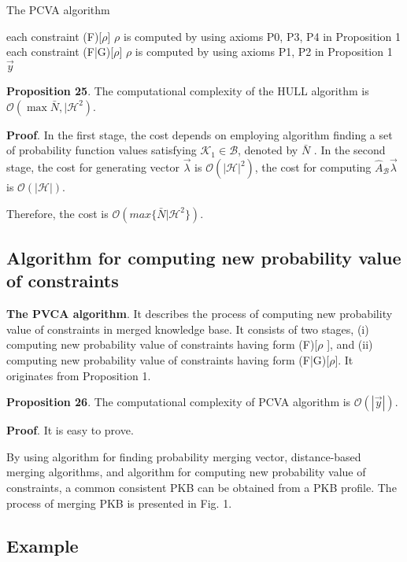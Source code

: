 \documentclass[]{iosart2c}
\begin{document}
\begin{algorithm}
\caption{The PCVA algorithm}
\begin{algorithmic}[1]
\For each constraint (F)[$\rho$] 
  \State $\rho$ is computed by using axioms P0, P3, P4 in Proposition 1
\EndFor
\For each constraint (F|G)[$\rho$]
  \State $\rho$ is computed by using axioms P1, P2 in Proposition 1
\EndFor
\State \Return $\vec{y}$
\end{algorithmic}
\end{algorithm}

\textbf{Proposition 25}. The computational complexity of the
HULL algorithm is $\mathcal{O}(\max{\bar N, |\mathcal{H}^2})$.

\textbf{Proof}. In the first stage, the cost depends on employing algorithm finding a set of probability function
values satisfying $\mathcal{K}_1 \in \mathcal{B}$, denoted by $\bar N$ . In the
second stage, the cost for generating vector $\vec{\lambda}$ is
$\mathcal{O}(|\mathcal{H}|^2)$, the cost for computing $\hat{A}_\mathcal{B}\vec{\lambda}$ is $\mathcal{O}(|\mathcal{H}|)$.

Therefore, the cost is $\mathcal{O}(max\{\bar N|\mathcal{H}^2\})$.

\subsection{Algorithm for computing new probability value of constraints}

\textbf{The PVCA algorithm}. It describes the process of computing new probability value of constraints in merged knowledge base. It consists of two stages, (i) computing new probability value of constraints having form (F)[$\rho$ ], and (ii) computing new probability value of constraints having form (F|G)[$\rho$]. It originates from Proposition 1.

\textbf{Proposition 26}. The computational complexity of PCVA algorithm is $\mathcal{O}(|\vec{y} |)$.

\textbf{Proof}. It is easy to prove. 

By using algorithm for finding probability merging vector, distance-based merging algorithms, and algorithm for computing new probability value of constraints, a common consistent PKB can be obtained from a PKB profile. The process of merging PKB is presented in Fig. 1.

\subsection{Example}
\end{document}
